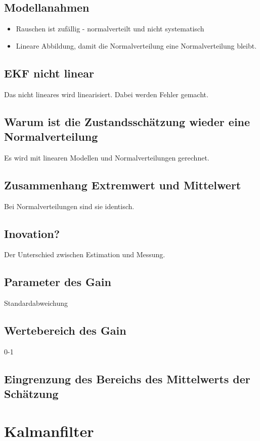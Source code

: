 \subsection{Modellanahmen}

\begin{itemize}
	\item Rauschen ist zufällig - normalverteilt und nicht systematisch
	\item Lineare Abbildung, damit die Normalverteilung eine Normalverteilung bleibt.
\end{itemize}

\subsection{EKF nicht linear}
 Das nicht lineares wird linearisiert. Dabei werden Fehler gemacht.

\subsection{Warum ist die Zustandsschätzung wieder eine Normalverteilung}
Es wird mit linearen Modellen und Normalverteilungen gerechnet.

\subsection{Zusammenhang Extremwert und Mittelwert}
Bei Normalverteilungen sind sie identisch.

\subsection{Inovation?}
Der Unterschied zwischen Estimation und Messung.

\subsection{Parameter des Gain}
Standardabweichung

\subsection{Wertebereich des Gain}
0-1

\subsection{Eingrenzung des Bereichs des Mittelwerts der Schätzung}


\section{Kalmanfilter}
\label{sec:faq:kalmanfilter}


